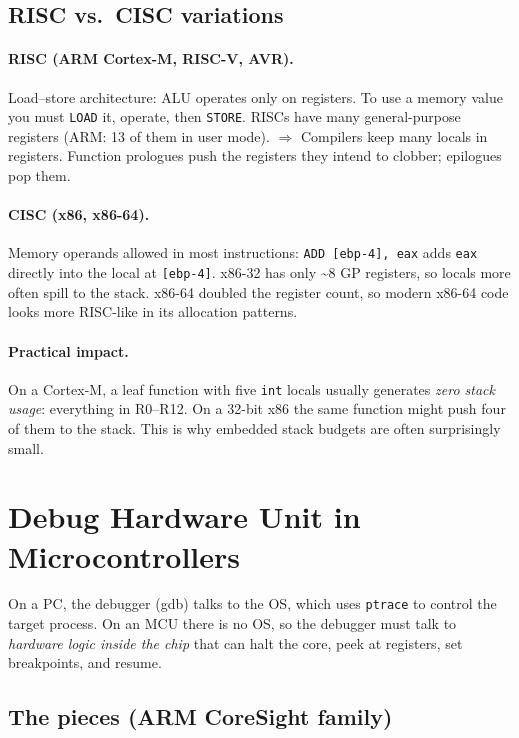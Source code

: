 \documentclass[11pt,a4paper]{article}
\begin{document}
\subsection{RISC vs.\ CISC variations}

\paragraph{RISC (ARM Cortex-M, RISC-V, AVR).}
Load--store architecture: ALU operates only on registers. To use a memory
value you must \texttt{LOAD} it, operate, then \texttt{STORE}.
RISCs have many general-purpose registers (ARM: 13 of them in user mode).
$\Rightarrow$ Compilers keep many locals in registers. Function prologues
push the registers they intend to clobber; epilogues pop them.

\paragraph{CISC (x86, x86-64).}
Memory operands allowed in most instructions: \texttt{ADD [ebp-4], eax}
adds \texttt{eax} directly into the local at \texttt{[ebp-4]}.
x86-32 has only \textasciitilde 8 GP registers, so locals more often
spill to the stack. x86-64 doubled the register count, so modern x86-64
code looks more RISC-like in its allocation patterns.

\paragraph{Practical impact.}
On a Cortex-M, a leaf function with five \texttt{int} locals usually
generates \emph{zero stack usage}: everything in R0--R12. On a 32-bit x86
the same function might push four of them to the stack. This is why
embedded stack budgets are often surprisingly small.

\section{Debug Hardware Unit in Microcontrollers}

On a PC, the debugger (gdb) talks to the OS, which uses \texttt{ptrace} to
control the target process. On an MCU there is no OS, so the debugger must
talk to \emph{hardware logic inside the chip} that can halt the core, peek
at registers, set breakpoints, and resume.

\subsection{The pieces (ARM CoreSight family)}
\end{document}
